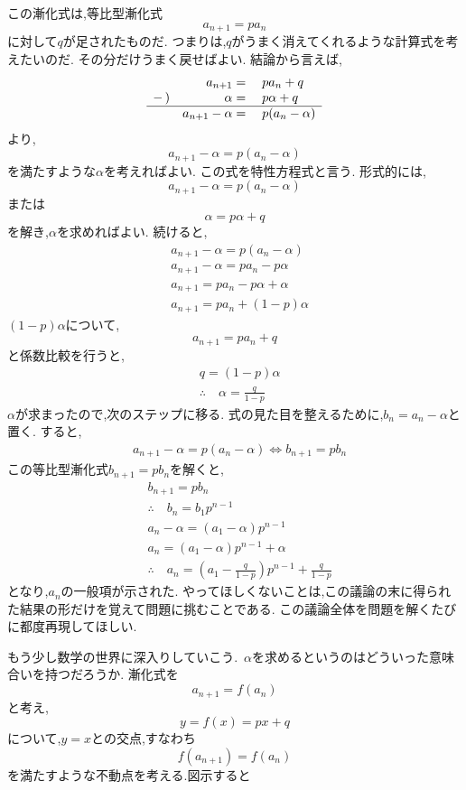   この漸化式は,等比型漸化式
  \[
    a_{n+1}=pa_n
  \]
  に対して$q$が足されたものだ.
  つまりは,$q$がうまく消えてくれるような計算式を考えたいのだ.
  その分だけうまく戻せばよい.
  結論から言えば,
  \[
    \begin{array}{rrl}
       & a_{n+1}={} & pa_n+q\\
      -\,) & \alpha={} & p\alpha+q\\ \hline
       & a_{n+1}-\alpha={} & p(a_n-\alpha)
    \end{array}
  \]
  より,
  \[
    a_{n+1}-\alpha=p(a_n-\alpha)
  \]
  を満たすような$\alpha$を考えればよい.
  この式を特性方程式と言う.
  形式的には,
  \[
    a_{n+1}-\alpha=p(a_n-\alpha)
  \]
  または
  \[
    \alpha=p\alpha+q
  \]
  を解き,$\alpha$を求めればよい.
  続けると,
  \begin{align*}
    &a_{n+1}-\alpha=p(a_n-\alpha)\\
    &a_{n+1}-\alpha=pa_n-p\alpha\\
    &a_{n+1}=pa_n-p\alpha+\alpha\\
    &a_{n+1}=pa_n+(1-p)\alpha
  \end{align*}
  $(1-p)\alpha$について,
  \[
    a_{n+1}=pa_n+q
  \]
  と係数比較を行うと,
  \begin{align*}
    &q=(1-p)\alpha\\
    &\therefore \quad \alpha=\frac{q}{1-p}
  \end{align*}
  $\alpha$が求まったので,次のステップに移る.
  式の見た目を整えるために,$b_n=a_n-\alpha$と置く.
  すると,
  \begin{align*}
    &a_{n+1}-\alpha=p(a_n-\alpha) \iff b_{n+1}=pb_n
  \end{align*}
  この等比型漸化式$b_{n+1}=pb_n$を解くと,
  \begin{align*}
    &b_{n+1}=pb_n\\
    &\therefore \quad b_n=b_1p^{n-1}\\
    &a_n-\alpha=(a_1-\alpha)p^{n-1}\\
    &a_n=(a_1-\alpha)p^{n-1}+\alpha\\
    &\therefore \quad a_n=\left(a_1-\frac{q}{1-p}\right)p^{n-1}+\frac{q}{1-p}
  \end{align*}
  となり,$a_n$の一般項が示された.
  やってほしくないことは,この議論の末に得られた結果の形だけを覚えて問題に挑むことである.
  この議論全体を問題を解くたびに都度再現してほしい.

  もう少し数学の世界に深入りしていこう.
  \,$\alpha$を求めるというのはどういった意味合いを持つだろうか.
  漸化式を
  \[
    a_{n+1}=f(a_n)
  \]
  と考え,
  \[
    y=f(x)=px+q
  \]
  について,$y=x$との交点,すなわち
  \[
    f(a_{n+1})=f(a_n)
  \]
  を満たすような不動点を考える.図示すると

